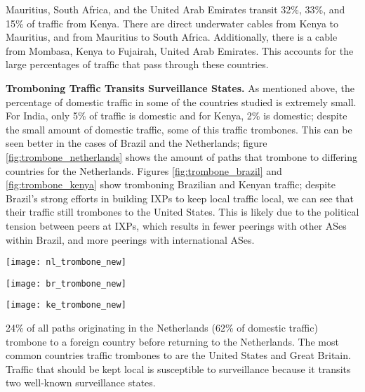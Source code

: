 Mauritius, South Africa, and the United Arab Emirates transit 32\%, 33\%, and 15\% of traffic from Kenya.  There are direct underwater cables from Kenya to Mauritius, and from Mauritius to South Africa.  Additionally, there is a cable from Mombasa, Kenya to Fujairah, United Arab Emirates.  This accounts for the large percentages of traffic that pass through these countries.

{\bf Tromboning Traffic Transits Surveillance States.}
As mentioned above, the percentage of domestic traffic in some of the countries studied is extremely small.  For India, only 5\% of traffic is domestic and for Kenya, 2\% is domestic; despite the small amount of domestic traffic, some of this traffic trombones.  This can be seen better in the cases of Brazil and the Netherlands; figure \ref{fig:trombone_netherlands} shows the amount of paths that trombone to differing countries for the Netherlands.  Figures \ref{fig:trombone_brazil} and \ref{fig:trombone_kenya} show tromboning Brazilian and Kenyan traffic; despite Brazil's strong efforts in building IXPs to keep local traffic local, we can see that their traffic still trombones to the United States.  This is likely due to the political tension between peers at IXPs, which results in fewer peerings with other ASes within Brazil, and more peerings with international ASes. 

\begin{figure*}[!htb]
  \texttt{[image: nl\_trombone\_new]}
  \caption{The countries that tromboning Netherlands traffic transits.}\label{fig:trombone_netherlands}
\endminipage\hfill
{}
  \texttt{[image: br\_trombone\_new]}
  \caption{The countries that tromboning Brazilian traffic transits.}\label{fig:trombone_brazil}
\endminipage\hfill
{}%
  \texttt{[image: ke\_trombone\_new]}
  \caption{The countries that tromboning Kenyan traffic transits.}\label{fig:trombone_kenya}
\endminipage
\end{figure*}


24\% of all paths originating in the Netherlands (62\% of domestic traffic) trombone to a foreign country before returning to the Netherlands. The most common countries traffic trombones to are the United States and Great Britain.  Traffic that should be kept local is susceptible to surveillance because it transits two well-known surveillance states.  

